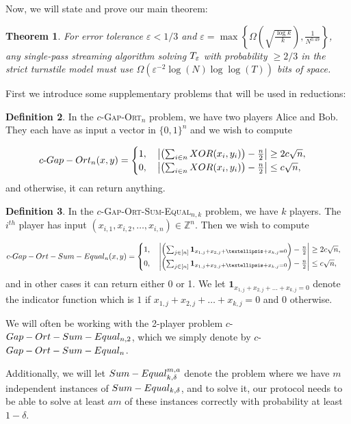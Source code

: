 \documentclass[11pt]{article}
\numberwithin{equation}{section}
\newtheorem{theorem}{Theorem}[section]
\theoremstyle{definition}
\newtheorem{definition}[theorem]{Definition}
\theoremstyle{plain}
\newcommand{\Z}{\mathbb Z}
\newcommand{\set}[1]{{\left \{{#1} \right \}}}
\newcommand{\gap}{\ensuremath{\varepsilon}}
\newcommand{\bigomega}[1]{\ensuremath{{\Omega \left( {#1} \right)}}}
\newcommand{\sumequal}{\textsc{Sum-Equal} }
\newcommand{\hest}{ \textsc{T} }
\newcommand{\go}{\textsc{Gap-Ort}}
\newcommand{\gose}{\textsc{Gap-Ort-Sum-Equal}}
\begin{document}
Now, we will state and prove our main theorem:
\begin{theorem}\label{thm:L0}
	For error tolerance $\gap <1/3$ and $\gap=\max\set{\bigomega{ \sqrt{\frac{\log k}{k}}}, \frac{1}{{N}^{0.49}}}$, 
	any single-pass streaming algorithm solving $\hest_\gap$ with probability $\ge 2/3$ in the strict turnstile model
	must use $\bigomega{\gap^{-2}\log (N)\log\log(T)}$ bits of space.
\end{theorem}

First we introduce some supplementary problems that will be used in reductions:

\begin{definition}
In the $c$-\go$_n$ problem, we have two players Alice and Bob. They each have as input a vector in $\{0,1\}^n$ and we wish to compute 

$$c\text{-}\go_n(x,y) = \begin{cases}
1, \quad \left|\left(\sum_{i \in n} \textbf{XOR}(x_i,y_i)\right) - \frac{n}{2}\right| \ge 2c\sqrt{n},\\
0, \quad \left|\left(\sum_{i \in n}  \textbf{XOR}(x_i,y_i)\right) - \frac{n}{2}\right| \le c\sqrt{n},\\
\end{cases}
$$
and otherwise, it can return anything.
\end{definition}
{\color{black}
\begin{definition}
In the $c$-\gose$_{n,k}$ problem, we have $k$ players. The $i^{th}$ player has input $(x_{i,1}, x_{i,2}, \dots, x_{i,n}) \in \Z^n$. Then we wish to compute

$$c\text{-}\gose_n(x,y) = \begin{cases}
1, \quad \left|\left(\sum_{j \in [n]} \mathbf{1}_{x_{1,j} + x_{2,j} + \dots + x_{k,j}= 0}\right) - \frac{n}{2}\right| \ge 2c\sqrt{n},\\
0, \quad \left|\left(\sum_{j \in [n]} \mathbf{1}_{x_{1,j} + x_{2,j} + \dots + x_{k,j}= 0}\right) - \frac{n}{2}\right| \le c\sqrt{n},\\
\end{cases}
$$
and in other cases it can return either 0 or 1. We let $\mathbf{1}_{x_{1,j} + x_{2,j} + \dots + x_{k,j}= 0}$ denote the indicator function which is $1$ if $x_{1,j} + x_{2,j} + \dots + x_{k,j}= 0$ and $0$ otherwise.
%

We will often be working with the 2-player problem $c$-$\gose_{n,2}$, which we simply denote by $c$-$\gose_n$.
\end{definition}
}
Additionally, we will let $\sumequal_{k,\delta}^{m,a}$ denote the problem where we have $m$ independent instances of $\sumequal_{k,\delta}$, and to solve it, our protocol needs to be able to solve at least $am$ of these instances correctly with probability at least $1-\delta$.
\end{document}
